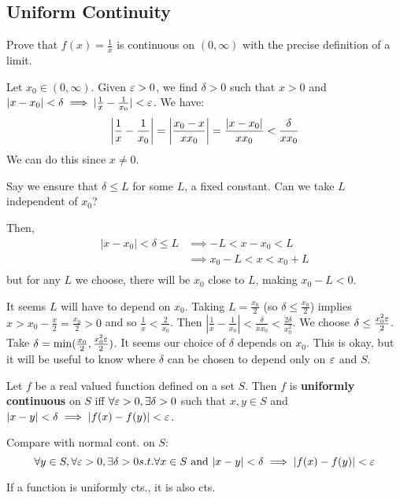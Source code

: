 \documentclass{article}
\begin{document}
\subsection{Uniform Continuity}
\begin{example}
Prove that $f(x) = \frac{1}{x}$ is continuous on $(0, \infty)$ with the precise definition of a limit.

Let $x_0 \in (0, \infty)$. Given $\varepsilon > 0$, we find $\delta > 0$ such that $x > 0$ and $|x - x_0| < \delta \implies |\frac{1}{x} - \frac{1}{x_0}| < \varepsilon$.
We have: \[
\abs{\frac{1}{x} - \frac{1}{x_0}} = \abs{\frac{x_0 - x}{xx_0}} = \frac{\abs{x - x_0}}{xx_0} < \frac{\delta}{xx_0}
\]
We can do this since $x \neq 0$.

Say we ensure that $\delta \leq L$ for some $L$, a fixed constant. Can we take $L$ independent of $x_0$?

Then, \begin{align*}
    |x - x_0| < \delta \leq L &\implies -L < x - x_0 < L\\
    &\implies x_0 - L < x < x_0 + L\\
\end{align*}
but for any $L$ we choose, there will be $x_0$ close to $L$, making $x_0 - L < 0$. 

It seems $L$ will have to depend on $x_0$. Taking $L = \frac{x_0}{2}$ (so $\delta \leq \frac{x_0}{2}$) implies $x > x_0 - \frac{x}{2} = \frac{x_0}{2} > 0$ and so $\frac{1}{x} < \frac{2}{x_0}$. Then $|\frac{1}{x} - \frac{1}{x_0}| < \frac{\delta}{xx_0} < \frac{2\delta}{x_0^2}$. We choose $\delta \leq \frac{x_0^2\varepsilon}{2}$. Take $\delta = \min(\frac{x_0}{2}, \frac{x_0^2\varepsilon}{2})$.  It seems our choice of $\delta$ depends on $x_0$. This is okay, but it will be useful to know where $\delta$ can be chosen to depend only on $\varepsilon$ and $S$.
\end{example}
\begin{definition}
Let $f$ be a real valued function defined on a set $S$.
Then $f$ is \textbf{uniformly continuous} on $S$ iff $\forall \varepsilon > 0, \exists \delta > 0$ such that $x, y \in S$ and $|x-y| < \delta \implies |f(x) - f(y)| < \varepsilon$.

Compare with normal cont. on $S$:
\[
\forall y \in S, \forall \varepsilon > 0, \exists \delta > 0 s.t. \forall x \in S \text{ and } |x-y| < \delta \implies |f(x) - f(y)| < \varepsilon
\]
\end{definition}
\begin{remark}
If a function is uniformly cts., it is also cts.
\end{remark}
\end{document}
